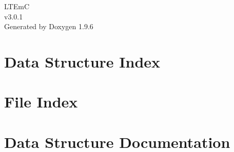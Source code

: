 \documentclass[twoside]{book}
\newcommand{\+}{\discretionary{\mbox{\scriptsize$\hookleftarrow$}}{}{}}
\newcommand{\clearemptydoublepage}{%
    \newpage{\pagestyle{empty}\cleardoublepage}%
  }
\begin{document}
  \raggedbottom
    \hypersetup{pageanchor=false,
                bookmarksnumbered=true,
                pdfencoding=unicode
               }
  \begin{titlepage}
  \vspace*{7cm}
  \begin{center}%
  {\Large LTEmC}\\
  [1ex]\large v3.\+0.\+1 \\
  \vspace*{1cm}
  {\large Generated by Doxygen 1.9.6}\\
  \end{center}
  \end{titlepage}
  \clearemptydoublepage
  \tableofcontents
  \clearemptydoublepage
  \hypersetup{pageanchor=true}
\chapter{Data Structure Index}

\chapter{File Index}

\chapter{Data Structure Documentation}



























\end{document}
